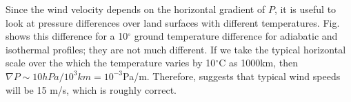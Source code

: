 \documentclass[11pt]{book}
\begin{document}

Since the wind velocity depends on the horizontal gradient of $P$, it is useful to look at pressure differences over land surfaces with different temperatures. Fig.~ shows this difference for a 10$^\circ$ ground temperature difference for adiabatic and isothermal profiles; they are not much different. If we take the typical horizontal scale over the which the temperature varies by 10$^\circ$C as 1000km, then $\nabla P\sim 10hPa/10^3km = 10^{-3}$Pa/m. Therefore,  suggests that typical wind speeds will be 15 m/s, which is roughly correct.


\end{document}
